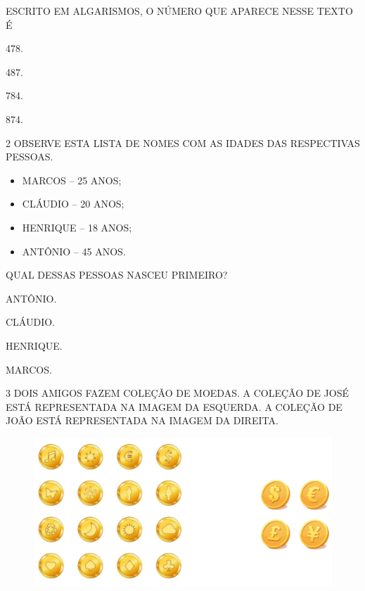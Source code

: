 ESCRITO EM ALGARISMOS, O NÚMERO QUE APARECE NESSE TEXTO É

\begin{escolha}
\item 478.

\item 487.

\item 784.

\item 874.
\end{escolha}

\num{2} OBSERVE ESTA LISTA DE NOMES COM AS IDADES DAS RESPECTIVAS PESSOAS.

\begin{myquote}
\begin{itemize}
  \item MARCOS -- 25 ANOS;
  \item CLÁUDIO -- 20 ANOS;
  \item HENRIQUE -- 18 ANOS;
  \item ANTÔNIO -- 45 ANOS.
\end{itemize}
\end{myquote}

QUAL DESSAS PESSOAS NASCEU PRIMEIRO?

\begin{escolha}
\item ANTÔNIO.

\item CLÁUDIO.

\item HENRIQUE.

\item MARCOS.
\end{escolha}

\pagebreak
\num{3} DOIS AMIGOS FAZEM COLEÇÃO DE MOEDAS. A COLEÇÃO DE JOSÉ ESTÁ REPRESENTADA NA IMAGEM DA
ESQUERDA. A COLEÇÃO DE JOÃO ESTÁ REPRESENTADA NA IMAGEM DA DIREITA.


\begin{figure}[H]
\includegraphics[width=\textwidth]{./media/SAEB_1ANO_MAT_FIGURA121.png}
\end{figure}

